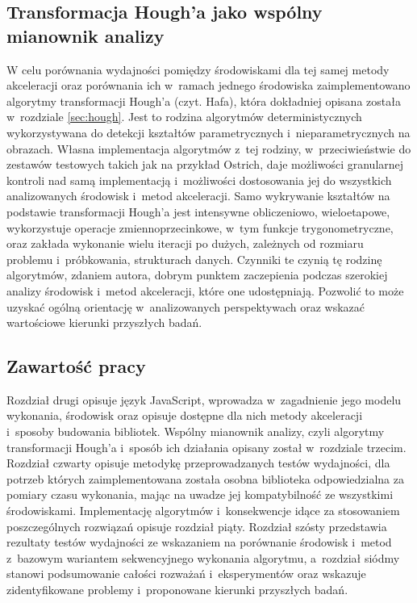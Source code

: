\subsection{Transformacja Hough'a jako wspólny mianownik analizy}

W celu porównania wydajności pomiędzy środowiskami dla tej samej metody akceleracji oraz porównania ich w~ramach jednego środowiska zaimplementowano algorytmy transformacji Hough'a (czyt. Hafa), która dokładniej opisana została w~rozdziale \ref{sec:hough}. Jest to rodzina algorytmów deterministycznych wykorzystywana do detekcji kształtów parametrycznych i~nieparametrycznych na obrazach.  Własna implementacja algorytmów z~tej rodziny, w~przeciwieństwie do zestawów testowych takich jak na przykład Ostrich\cite{ostrich}, daje możliwości granularnej kontroli nad samą implementacją i~możliwości dostosowania jej do wszystkich analizowanych środowisk i~metod akceleracji. Samo wykrywanie kształtów na podstawie transformacji Hough'a jest intensywne obliczeniowo, wieloetapowe, wykorzystuje operacje zmiennoprzecinkowe, w~tym funkcje trygonometryczne, oraz zakłada wykonanie wielu iteracji po dużych, zależnych od rozmiaru problemu i~próbkowania, strukturach danych. Czynniki te czynią tę rodzinę algorytmów, zdaniem autora, dobrym punktem zaczepienia podczas szerokiej analizy środowisk i~metod akceleracji, które one udostępniają. Pozwolić to może uzyskać ogólną orientację w~analizowanych perspektywach oraz wskazać wartościowe kierunki przyszłych badań. 

\subsection{Zawartość pracy}

Rozdział drugi opisuje język JavaScript, wprowadza w~zagadnienie jego modelu wykonania, środowisk oraz opisuje dostępne dla nich metody akceleracji i~sposoby budowania bibliotek. Wspólny mianownik analizy, czyli algorytmy transformacji Hough'a i~sposób ich działania opisany został w~rozdziale trzecim. Rozdział czwarty opisuje metodykę przeprowadzanych testów wydajności, dla potrzeb których zaimplementowana została osobna biblioteka odpowiedzialna za pomiary czasu wykonania, mając na uwadze jej kompatybilność ze wszystkimi środowiskami. Implementację algorytmów i~konsekwencje idące za stosowaniem poszczególnych rozwiązań opisuje rozdział piąty. Rozdział szósty przedstawia rezultaty testów wydajności ze wskazaniem na porównanie środowisk i~metod z~bazowym wariantem sekwencyjnego wykonania algorytmu, a~rozdział siódmy stanowi podsumowanie całości rozważań i~eksperymentów oraz wskazuje zidentyfikowane problemy i~proponowane kierunki przyszłych badań.
